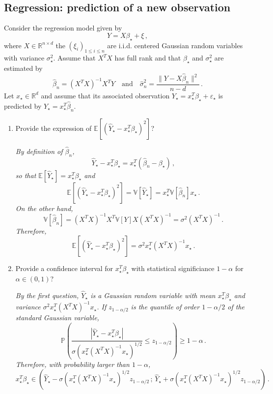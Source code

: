\documentclass[a4paper,10pt,fleqn]{article}
\newcommand{\eqsp}{\,}
\newcommand{\rset}{\ensuremath{\mathbb{R}}}
\newcommand{\1}{\ensuremath{\mathbbm{1}}}
\newcommand{\bE}{\mathbb{E}}
\begin{document}
\subsection*{Regression: prediction of a new observation}
Consider the regression model given by
$$
Y = X\beta_{\star}+ \xi\eqsp,
$$
where $X\in\rset^{n\times d}$ the $(\xi_{i})_{1\leqslant i \leqslant n}$ are i.i.d. centered Gaussian random variables with variance $\sigma_{\star}^2$. Assume that $X^TX$ has full rank and that $\beta_\star$ and $\sigma_{\star}^2$ are estimated by 
$$
\widehat \beta_n = (X^TX)^{-1}X^TY\quad\mathrm{and}\quad \widehat \sigma^2_n =\frac{\|Y - X\widehat \beta_n \|^2}{n-d}\eqsp.
$$
Let $x_\star \in\rset^d$ and assume that its associated observation $Y_\star = x_\star^T\beta_\star + \varepsilon_\star$ is predicted by $\widehat Y_\star = x_\star^T\widehat \beta_n$.
\begin{enumerate}
\item  Provide the expression of $\bE[(\widehat Y_\star - x_\star^T\beta_\star)^2]$?

\vspace{.2cm}

{\em
By definition of $\widehat \beta_n $,
$$
\widehat Y_\star - x_\star^T\beta_\star = x_\star^T (\widehat\beta_n - \beta_\star)\,,
$$
so that $\bE[\widehat Y_\star] =  x_\star^T\beta_\star$ and
$$
\bE[(\widehat Y_\star - x_\star^T\beta_\star)^2] = \mathbb{V}[\widehat Y_\star] = x_\star^T \mathbb{V}[\widehat\beta_n]x_\star\,.
$$
On the other hand,
$$
\mathbb{V}[\widehat\beta_n] = (X^TX)^{-1}X^T \mathbb{V}[Y] X(X^TX)^{-1} = \sigma^2(X^TX)^{-1}\,.
$$
Therefore,
$$
\bE[(\widehat Y_\star - x_\star^T\beta_\star)^2] = \sigma^2x_\star^T(X^TX)^{-1}x_\star\,.
$$
}

\item  Provide a confidence interval for $x_\star^T\beta_\star$ with statistical significiance $1-\alpha$ for $\alpha\in(0,1)$?

\vspace{.2cm}

{\em
By the first question, $\widehat Y_\star$ is a Gaussian random variable with mean $x_\star^T\beta_\star$ and variance $\sigma^2x_\star^T(X^TX)^{-1}x_\star$. If $z_{1-\alpha/2}$ is the quantile of order $1-\alpha/2$ of the standard Gaussian variable,
$$
\mathbb{P}\left(\frac{\left|\widehat Y_\star-x_\star^T\beta_\star\right|}{\sigma(x_\star^T(X^TX)^{-1}x_\star)^{1/2}}\leqslant z_{1-\alpha/2}\right)\geqslant 1-\alpha\,.
$$
Therefore, with probability larger than $1-\alpha$,
$$
x_\star^T\beta_\star \in \left(\widehat Y_\star - \sigma(x_\star^T(X^TX)^{-1}x_\star)^{1/2}z_{1-\alpha/2}\,;\, \widehat Y_\star + \sigma(x_\star^T(X^TX)^{-1}x_\star)^{1/2}z_{1-\alpha/2}\right)\,.
$$
}
\end{enumerate}
\end{document}
